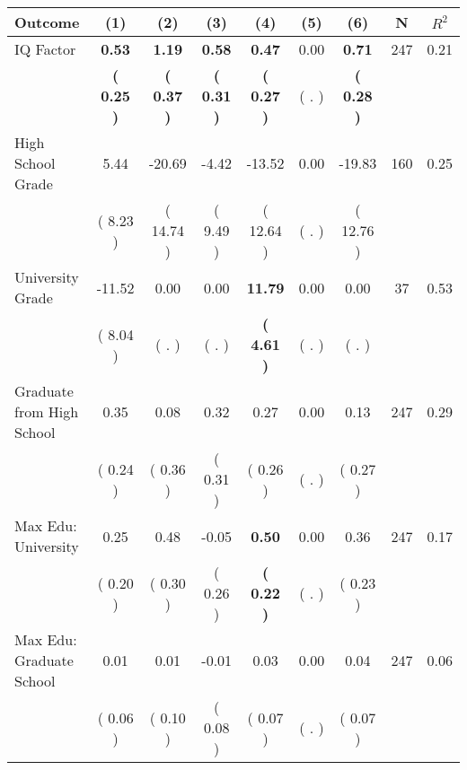 \begin{tabular}{lcccccccc}
\toprule
 \textbf{Outcome} & \textbf{(1)} & \textbf{(2)} & \textbf{(3)} & \textbf{(4)} & \textbf{(5)} & \textbf{(6)} & \textbf{N} & \textbf{$ R^2$} \\
\midrule
IQ Factor & \textbf{     0.53} & \textbf{     1.19} & \textbf{     0.58} & \textbf{     0.47} &      0.00 & \textbf{     0.71} & 247 &       0.21 \\ 
 & \textbf{(     0.25 )} & \textbf{(     0.37 )} & \textbf{(     0.31 )} & \textbf{(     0.27 )} & (        . ) & \textbf{(     0.28 )} & \\
High School Grade &      5.44 &    -20.69 &     -4.42 &    -13.52 &      0.00 &    -19.83 & 160 &       0.25 \\ 
 & (     8.23 ) & (    14.74 ) & (     9.49 ) & (    12.64 ) & (        . ) & (    12.76 ) & \\
University Grade &    -11.52 &      0.00 &      0.00 & \textbf{    11.79} &      0.00 &      0.00 & 37 &       0.53 \\ 
 & (     8.04 ) & (        . ) & (        . ) & \textbf{(     4.61 )} & (        . ) & (        . ) & \\
Graduate from High School &      0.35 &      0.08 &      0.32 &      0.27 &      0.00 &      0.13 & 247 &       0.29 \\ 
 & (     0.24 ) & (     0.36 ) & (     0.31 ) & (     0.26 ) & (        . ) & (     0.27 ) & \\
Max Edu: University &      0.25 &      0.48 &     -0.05 & \textbf{     0.50} &      0.00 &      0.36 & 247 &       0.17 \\ 
 & (     0.20 ) & (     0.30 ) & (     0.26 ) & \textbf{(     0.22 )} & (        . ) & (     0.23 ) & \\
Max Edu: Graduate School &      0.01 &      0.01 &     -0.01 &      0.03 &      0.00 &      0.04 & 247 &       0.06 \\ 
 & (     0.06 ) & (     0.10 ) & (     0.08 ) & (     0.07 ) & (        . ) & (     0.07 ) & \\
\bottomrule
\end{tabular}
